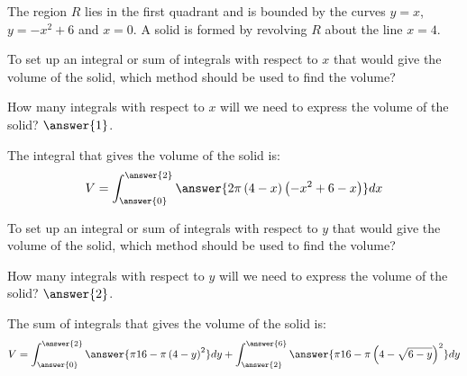 \documentclass{ximera}
\author{Jim Talamo and Jason Miller}
\begin{document}
\begin{exercise}

The region $R$ lies in the first quadrant and is bounded by the curves $y=x$, $y=-x^{2}+6$ and $x=0$.  A solid is formed by revolving $R$ about the line $x=4$. 

To set up an integral or sum of integrals with respect to $x$ that would give the volume of the solid, which method should be used to find the volume?

\begin{multipleChoice}
\end{multipleChoice}

How many integrals with respect to $x$ will we need to express the volume of the solid? $\answer{1}$. 


\begin{exercise} 
The integral that gives the volume of the solid is: 
\[
V=\int_{\answer{0}}^{\answer{2}} \answer{ 2\pi \left( 4-x \right) \left(-x^{2}+6 -x \right)} dx
\] 


\end{exercise}


To set up an integral or sum of integrals with respect to $y$ that would give the volume of the solid, which method should be used to find the volume?

\begin{multipleChoice}
\end{multipleChoice}

How many integrals with respect to $y$ will we need to express the volume of the solid? $\answer{2}$. 

\begin{exercise}

The sum of integrals that gives the volume of the solid is: 
\[
V= \int_{\answer{0}}^{\answer{2}} \answer{ \pi 16- \pi \left( 4-y \right)^{2} } dy + \int_{\answer{2}}^{\answer{6}} \answer{ \pi 16 - \pi \left(4 -\sqrt{6-y} \right)^{2}} dy
\]

\end{exercise}

\end{exercise}
\end{document}
